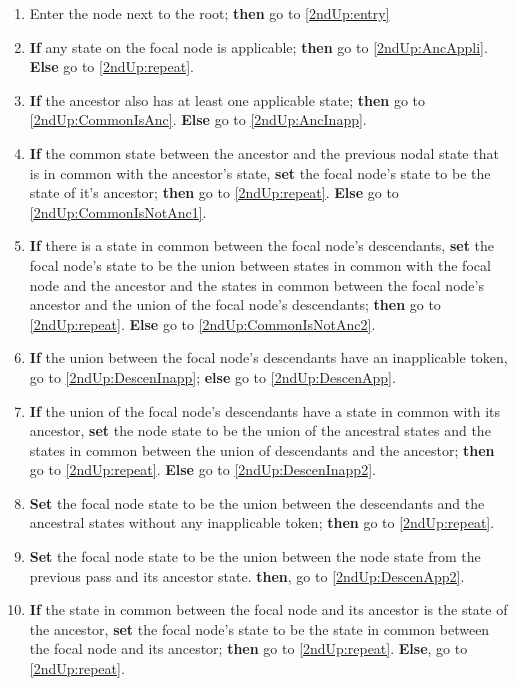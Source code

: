 \documentclass[a4paper,12pt]{article}
\begin{document}
\begin{enumerate}
    \item Enter the node next to the root; \textbf{then} go to \ref{2ndUp:entry}
    \item \label{2ndUp:entry} \textbf{If} any state on the focal node is applicable; \textbf{then} go to \ref{2ndUp:AncAppli}. \textbf{Else} go to \ref{2ndUp:repeat}.
    \item \label{2ndUp:AncAppli} \textbf{If} the ancestor also has at least one applicable state; \textbf{then} go to \ref{2ndUp:CommonIsAnc}. \textbf{Else} go to \ref{2ndUp:AncInapp}.
    \item \label{2ndUp:CommonIsAnc} \textbf{If} the common state between the ancestor and the previous nodal state that is in common with the ancestor's state, \textbf{set} the focal node's state to be the state of it's ancestor; \textbf{then} go to \ref{2ndUp:repeat}. \textbf{Else} go to \ref{2ndUp:CommonIsNotAnc1}.
    \item \label{2ndUp:CommonIsNotAnc1} \textbf{If} there is a state in common between the focal node's descendants, \textbf{set} the focal node's state to be the union between states in common with the focal node and the ancestor and the states in common between the focal node's ancestor and the union of the focal node's descendants; \textbf{then} go to \ref{2ndUp:repeat}. \textbf{Else} go to \ref{2ndUp:CommonIsNotAnc2}.
    \item \label{2ndUp:CommonIsNotAnc2} \textbf{If} the union between the focal node's descendants have an inapplicable token, go to \ref{2ndUp:DescenInapp}; \textbf{else} go to \ref{2ndUp:DescenApp}.
    \item \label{2ndUp:DescenInapp} \textbf{If} the union of the focal node's descendants have a state in common with its ancestor, \textbf{set} the node state to be the union of the ancestral states and the states in common between the union of descendants and the ancestor; \textbf{then} go to \ref{2ndUp:repeat}. \textbf{Else} go to \ref{2ndUp:DescenInapp2}.
    \item \label{2ndUp:DescenInapp2} \textbf{Set} the focal node state to be the union between the descendants and the ancestral states without any inapplicable token; \textbf{then} go to \ref{2ndUp:repeat}.
    \item \label{2ndUp:DescenApp} \textbf{Set} the focal node state to be the union between the node state from the previous pass and its ancestor state. \textbf{then}, go to \ref{2ndUp:DescenApp2}.
    \item \label{2ndUp:DescenApp2} \textbf{If} the state in common between the focal node and its ancestor is the state of the ancestor, \textbf{set} the focal node's state to be the state in common between the focal node and its ancestor; \textbf{then} go to \ref{2ndUp:repeat}. \textbf{Else}, go to \ref{2ndUp:repeat}.

\end{enumerate}
\end{document}
